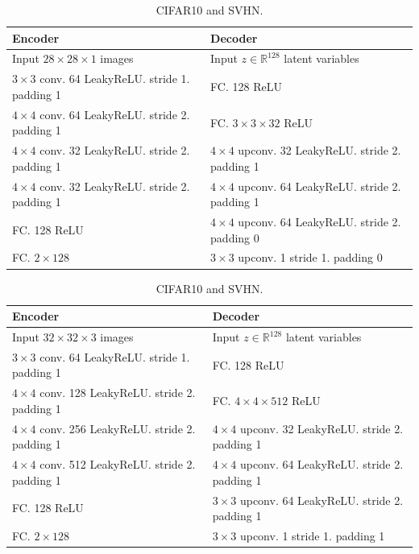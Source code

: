 \begin{table}[!h]
\caption{Architecture of VAE}
    \centering
    \begin{subtable}[h]{\textwidth}
    \caption{MNIST and Fashion-MNIST.}
    \centering
        \begin{tabular}{|l|l|}
        \toprule
        \textbf{Encoder} & \textbf{Decoder} \\
        \midrule
        Input $28\times28\times1$ images & Input $z\in \mathbb{R}^{128}$ latent variables \\
        \hline 
        $3\times3$ conv. 64 LeakyReLU. stride 1. padding 1 & FC. 128 ReLU \\
        \hline 
        $4\times4$ conv. 64 LeakyReLU. stride 2. padding 1 & FC. $3\times3\times32$ ReLU \\
        \hline 
        $4\times4$ conv. 32 LeakyReLU. stride 2. padding 1 & $4\times4$ upconv. 32 LeakyReLU. stride 2. padding 1 \\
        \hline
        $4\times4$ conv. 32 LeakyReLU. stride 2. padding 1 & $4\times4$ upconv. 64 LeakyReLU. stride 2. padding 1 \\
        \hline
        FC. 128 ReLU & $4\times4$ upconv. 64 LeakyReLU. stride 2. padding 0 \\
        \hline
        FC. $2\times128$ & $3\times3$ upconv. 1 stride 1. padding 0 \\
        \bottomrule
        \end{tabular}
    \vspace*{1ex}
    \end{subtable}
    \begin{subtable}[h]{\textwidth}
    \caption{CIFAR10 and SVHN.}
    \centering
        \begin{tabular}{|l|l|}
        \toprule
        \textbf{Encoder} & \textbf{Decoder} \\
        \midrule
        Input $32\times32\times3$ images & Input $z\in \mathbb{R}^{128}$ latent variables \\
        \hline 
        $3\times3$ conv. 64 LeakyReLU. stride 1. padding 1 & FC. 128 ReLU \\
        \hline 
        $4\times4$ conv. 128 LeakyReLU. stride 2. padding 1 & FC. $4\times4\times512$ ReLU \\
        \hline 
        $4\times4$ conv. 256 LeakyReLU. stride 2. padding 1 & $4\times4$ upconv. 32 LeakyReLU. stride 2. padding 1 \\
        \hline
        $4\times4$ conv. 512 LeakyReLU. stride 2. padding 1 & $4\times4$ upconv. 64 LeakyReLU. stride 2. padding 1 \\
        \hline
        FC. 128 ReLU & $3\times3$ upconv. 64 LeakyReLU. stride 2. padding 1 \\
        \hline
        FC. $2\times128$ & $3\times3$ upconv. 1 stride 1. padding 1 \\
        \bottomrule
        \end{tabular}
    \vspace*{1ex}
    \end{subtable}
    \label{appendex:tab:arch-vae}
\end{table}

